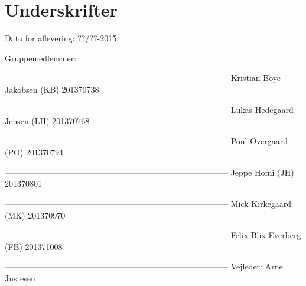 \chapter*{Underskrifter}

Dato for aflevering: ??/??-2015

Gruppemedlemmer: \newline


--------------------------------------------------------------------------------- \newline
Kristian Boye Jakobsen (KB) 201370738\newline


--------------------------------------------------------------------------------- \newline
Lukas Hedegaard Jensen (LH) 201370768\newline


--------------------------------------------------------------------------------- \newline
Poul Overgaard (PO) 201370794\newline


--------------------------------------------------------------------------------- \newline
Jeppe Hofni (JH) 201370801\newline


--------------------------------------------------------------------------------- \newline
Mick Kirkegaard (MK) 201370970\newline


--------------------------------------------------------------------------------- \newline
Felix Blix Everberg (FB) 201371008\newline













--------------------------------------------------------------------------------- \newline
Vejleder: Arne Justesen \newline

\afterpage{\null\newpage}

